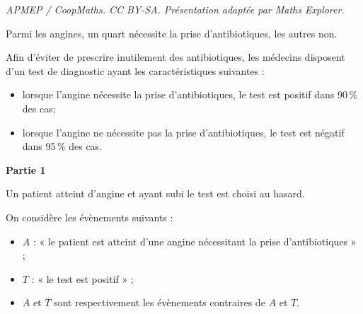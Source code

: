 \documentclass[10pt]{article}
\begin{document}
\noindent\textit{APMEP / CoopMaths. CC BY-SA. Présentation adaptée par Maths Explorer.}\par\medskip
\medskip

Parmi les angines, un quart nécessite la prise d'antibiotiques, les autres non.

Afin d'éviter de prescrire inutilement des antibiotiques, les médecins disposent d'un test de diagnostic ayant les caractéristiques suivantes :

\begin{itemize}
\item[$\bullet~~$]lorsque l'angine nécessite la prise d'antibiotiques, le test est positif dans 90\,\% des cas;
\item[$\bullet~~$]lorsque l'angine ne nécessite pas la prise d'antibiotiques, le test est négatif dans 95\,\% des cas.
\end{itemize}





\bigskip

\textbf{Partie 1}

\medskip

Un patient atteint d'angine et ayant subi le test est choisi au hasard. 

On considère les évènements suivants :

\begin{itemize}
\item[$\bullet~~$]$A$ : « le patient est atteint d'une angine nécessitant la prise d'antibiotiques »{} ; 
\item[$\bullet~~$]$T$ : « le test est positif »{} ;
\item[$\bullet~~$]$\overline{A}$ et $\overline{T}$ sont respectivement les évènements contraires de $A$ et $T$.
\end{itemize}
\end{document}
